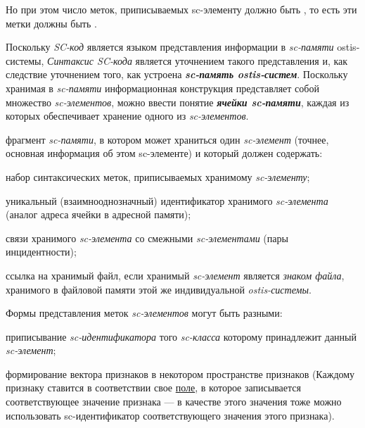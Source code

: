 Но при этом число меток, приписываемых sc-элементу должно быть , то есть эти метки должны быть .

Поскольку \textit{SC-код} является языком  представления информации в \textit{sc-памяти} ostis-системы, \textit{Синтаксис SC-кода} является уточнением  такого представления и, как следствие уточнением того, как устроена \textbf{\textit{sc-память ostis-систем}}. Поскольку хранимая в \textit{sc-памяти} информационная конструкция представляет собой множество \textit{sc-элементов}, можно ввести понятие \textbf{\textit{ячейки sc-памяти}}, каждая из которых обеспечивает хранение одного из \textit{sc-элементов}.

\begin{SCn}
	{фрагмент \textit{sc-памяти}, в котором может храниться один \textit{sc-элемент} (точнее, основная информация об этом sc-элементе) и который должен содержать:
		\begin{textitemize}
			\item набор синтаксических меток, приписываемых хранимому \textit{sc-элементу};
			\item уникальный (взаимнооднозначный) идентификатор хранимого \textit{sc-элемента} (аналог адреса ячейки в адресной памяти);
			\item связи хранимого \textit{sc-элемента} со смежными \textit{sc-элементами} (пары инцидентности);
			\item ссылка на хранимый файл, если хранимый \textit{sc-элемент} является \textit{знаком файла}, хранимого в файловой памяти этой же индивидуальной \textit{ostis-системы}.
		\end{textitemize}
	}
\end{SCn}

Формы представления меток \textit{sc-элементов} могут быть разными:
\begin{textitemize}
	\item приписывание \textit{sc-идентификатора} того \textit{sc-класса} которому принадлежит данный \textit{sc-элемент};
	\item формирование вектора признаков в некотором пространстве признаков (Каждому признаку ставится в соответствии свое \uline{поле}, в которое записывается соответствующее значение признака --- в качестве этого значения тоже можно использовать sc-идентификатор соответствующего значения этого признака).
\end{textitemize}

